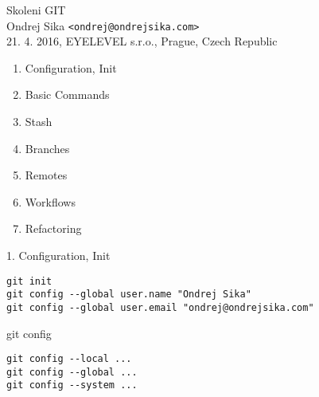 \documentclass{beamer}
\begin{document}
\begin{frame}

    {\LARGE Skoleni GIT}\\
    \vspace{7mm}
    {\Large Ondrej Sika \lstinline|<ondrej@ondrejsika.com>|}\\
    \vspace{7mm}
    \vspace{7mm}
    21. 4. 2016, EYELEVEL s.r.o., Prague, Czech Republic\\

\end{frame}

\begin{frame}[fragile]

    \begin{enumerate}
        \item Configuration, Init
        \item Basic Commands
        \item Stash
        \item Branches
        \item Remotes
        \item Workflows
        \item Refactoring
    \end{enumerate}

\end{frame}


\begin{frame}[fragile]

    {\LARGE 1. Configuration, Init}\\

    \begin{verbatim}
git init
git config --global user.name "Ondrej Sika"
git config --global user.email "ondrej@ondrejsika.com"
    \end{verbatim}

\end{frame}


\begin{frame}[fragile]

    {\LARGE git config}\\

    \begin{verbatim}
git config --local ...
git config --global ...
git config --system ...
    \end{verbatim}

\end{frame}
\end{document}
